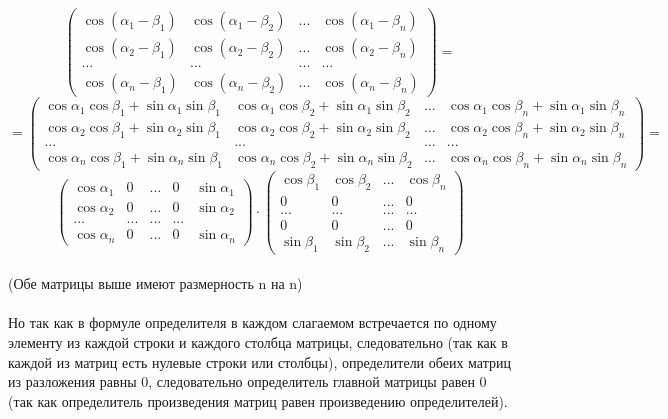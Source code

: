 \documentclass[a4paper, 12pt]{article}
\begin{document}
    \[
        \begin{pmatrix}\cos (\alpha_1 - \beta_1) & \cos (\alpha_1 - \beta_2) & ... & \cos (\alpha_1 - \beta_n) \\ \cos (\alpha_2 - \beta_1) & \cos (\alpha_2 - \beta_2) & ... & \cos (\alpha_2 - \beta_n) \\ ... & ... & ... & ... \\ \cos (\alpha_n - \beta_1) & \cos (\alpha_n - \beta_2) & ... & \cos (\alpha_n - \beta_n)\end{pmatrix} = 
    \]
    \[
        = \begin{pmatrix}\cos \alpha_1 \cos \beta_1 + \sin \alpha_1 \sin \beta_1 & \cos \alpha_1 \cos \beta_2 + \sin \alpha_1 \sin \beta_2 & ... & \cos \alpha_1 \cos \beta_n + \sin \alpha_1 \sin \beta_n \\ \cos \alpha_2 \cos \beta_1 + \sin \alpha_2 \sin \beta_1 & \cos \alpha_2 \cos \beta_2 + \sin \alpha_2 \sin \beta_2 & ... & \cos \alpha_2 \cos \beta_n + \sin \alpha_2 \sin \beta_n \\ ... & ... & ... & ... \\ \cos \alpha_n \cos \beta_1 + \sin \alpha_n \sin \beta_1 & \cos \alpha_n \cos \beta_2 + \sin \alpha_n \sin \beta_2 & ... & \cos \alpha_n \cos \beta_n + \sin \alpha_n \sin \beta_n \end{pmatrix} = 
    \]
    \[
        \begin{pmatrix}\cos \alpha_1 & 0 & ... & 0 & \sin \alpha_1 \\ \cos \alpha_2 & 0 & ... & 0 & \sin \alpha_2 \\ ... & ... & ... & ... \\ \cos \alpha_n & 0 & ... & 0 & \sin \alpha_n \end{pmatrix} \cdot \begin{pmatrix}\cos \beta_1 & \cos \beta_2 & ... & \cos \beta_n \\ 0 & 0 & ... & 0 \\ ... & ... & ... & ... \\ 0 & 0 & ... & 0\\ \sin \beta_1 & \sin \beta_2 & ... & \sin \beta_n \end{pmatrix}
    \]
    \\ (Обе матрицы выше имеют размерность n на n)
    \\
    \\ Но так как в формуле определителя в каждом слагаемом встречается по одному элементу из каждой строки и каждого столбца матрицы, следовательно (так как в каждой из матриц есть нулевые строки или столбцы), определители обеих матриц из разложения равны 0, следовательно определитель главной матрицы равен 0 (так как определитель произведения матриц равен произведению определителей).
\end{document}
